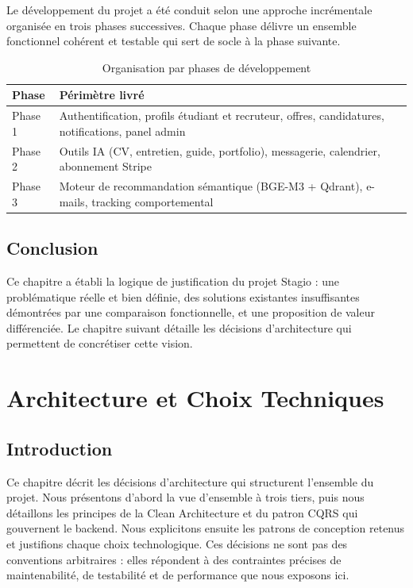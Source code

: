 ﻿\documentclass[12pt,a4paper]{report}
\begin{document}
Le développement du projet a été conduit selon une approche incrémentale organisée en trois phases successives. Chaque phase délivre un ensemble fonctionnel cohérent et testable qui sert de socle à la phase suivante.

\begin{table}[H]
\centering
\begin{tabularx}{\textwidth}{lX}
\toprule
\textbf{Phase} & \textbf{Périmètre livré} \\
\midrule
Phase 1 & Authentification, profils étudiant et recruteur, offres, candidatures, notifications, panel admin \\
Phase 2 & Outils IA (CV, entretien, guide, portfolio), messagerie, calendrier, abonnement Stripe \\
Phase 3 & Moteur de recommandation sémantique (BGE-M3 + Qdrant), e-mails, tracking comportemental \\
\bottomrule
\end{tabularx}
\caption{Organisation par phases de développement}
\end{table}

\section*{Conclusion}

Ce chapitre a établi la logique de justification du projet Stagio : une problématique réelle et bien définie, des solutions existantes insuffisantes démontrées par une comparaison fonctionnelle, et une proposition de valeur différenciée. Le chapitre suivant détaille les décisions d'architecture qui permettent de concrétiser cette vision.

\chapter{Architecture et Choix Techniques}
\label{chap:archi}

\section*{Introduction}
Ce chapitre décrit les décisions d'architecture qui structurent l'ensemble du projet. Nous présentons d'abord la vue d'ensemble à trois tiers, puis nous détaillons les principes de la Clean Architecture et du patron CQRS qui gouvernent le backend. Nous explicitons ensuite les patrons de conception retenus et justifions chaque choix technologique. Ces décisions ne sont pas des conventions arbitraires : elles répondent à des contraintes précises de maintenabilité, de testabilité et de performance que nous exposons ici.
\end{document}
